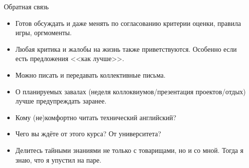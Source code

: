 \begin{frame}[t]{Обратная связь}
	\begin{itemize}
		\item
			Готов обсуждать и даже менять по согласованию критерии оценки, правила игры, оргмоменты.
		\item
			Любая критика и жалобы на жизнь также приветствуются.
			Особенно если есть предложения <<как лучше>>.
		\item
			Можно писать и передавать коллективные письма.
		\item
			О планируемых завалах (неделя коллоквиумов/презентация проектов/отдых) лучше предупреждать заранее.
		\item
			Кому (не)комфортно читать технический английский?
		\item
			Чего вы ждёте от этого курса? От университета?
		\item
			Делитесь тайными знаниями не только с товарищами, но и со мной.
			Тогда я знаю, что я упустил на паре.
	\end{itemize}
\end{frame}
